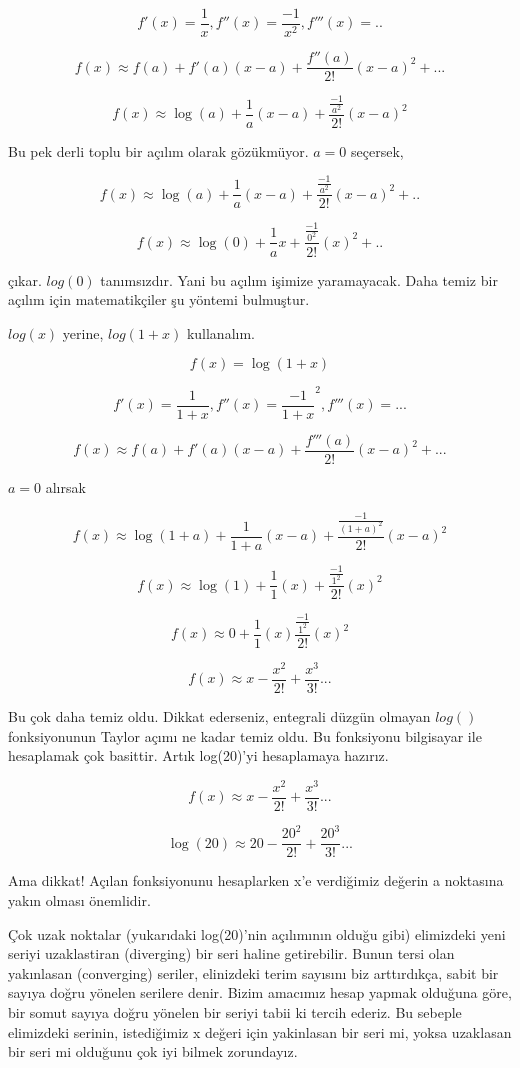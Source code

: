 \documentclass[12pt,fleqn]{article}\usepackage{../../common}
\begin{document}
$$ f'(x) = \frac{1}{x}, f''(x) = \frac{-1}{x^2}, f'''(x)=.. $$

$$ f(x) \approx f(a) + f'(a)(x-a)+\frac{f''(a)}{2!}(x-a)^2 + ... $$

$$ f(x) \approx \log(a) + \frac{1}{a}(x-a) + \frac{\frac{-1}{a^2}}{2!}(x-a)^2 $$

Bu pek derli toplu bir açılım olarak gözükmüyor. $a=0$ seçersek, 

$$ f(x) \approx \log(a) + \frac{1}{a}(x-a) + \frac{\frac{-1}{a^2}}{2!}(x-a)^2 + ..$$

$$ f(x) \approx \log(0) + \frac{1}{a}x + \frac{\frac{-1}{0^2}}{2!}(x)^2 + ..$$

çıkar. $log(0)$ tanımsızdır. Yani bu açılım işimize yaramayacak. Daha temiz
bir açılım için matematikçiler şu yöntemi bulmuştur.

$log(x)$ yerine, $log(1+x)$ kullanalım. 

$$ f(x) = \log(1+x) $$

$$ f'(x) = \frac{1}{1+x}, f''(x) = \frac{-1}{1+x}^2, f'''(x) = ... $$

$$ f(x) \approx f(a) + f'(a)(x-a) + \frac{f'''(a)}{2!}(x-a)^2 + ... $$

$a = 0$ alırsak

$$ f(x) \approx \log(1+a) + \frac{1}{1+a} (x-a)+ \frac{\frac{-1}{(1+a)^2}}{2!} (x-a)^2$$

$$ f(x) \approx \log(1) + \frac{1}{1}(x) + \frac{\frac{-1}{1^2}}{2!} (x)^2$$

$$ f(x) \approx 0 + \frac{1}{1}(x) \frac{\frac{-1}{1^2}}{2!} (x)^2 $$

$$ f(x) \approx x - \frac{x^2}{2!}  + \frac{x^3}{3!} ... $$

Bu çok daha temiz oldu. Dikkat ederseniz, entegrali düzgün olmayan $log()$
fonksiyonunun Taylor açımı ne kadar temiz oldu. Bu fonksiyonu bilgisayar
ile hesaplamak çok basittir. Artık log(20)'yi hesaplamaya hazırız.

$$ f(x) \approx x - \frac{x^2}{2!}  + \frac{x^3}{3!} ... $$

$$ \log(20) \approx 20 - \frac{20^2}{2!} + \frac{20^3}{3!} ... $$

Ama dikkat! Açılan fonksiyonunu hesaplarken x'e verdiğimiz değerin a
noktasına yakın olması önemlidir.

Çok uzak noktalar (yukarıdaki log(20)'nin açılımının olduğu gibi)
elimizdeki yeni seriyi uzaklastiran (diverging) bir seri haline
getirebilir. Bunun tersi olan yakınlasan (converging) seriler, elinizdeki
terim sayısını biz arttırdıkça, sabit bir sayıya doğru yönelen serilere
denir. Bizim amacımız hesap yapmak olduğuna göre, bir somut sayıya doğru
yönelen bir seriyi tabii ki tercih ederiz. Bu sebeple elimizdeki serinin,
istediğimiz x değeri için yakinlasan bir seri mi, yoksa uzaklasan bir seri
mi olduğunu çok iyi bilmek zorundayız.
\end{document}
